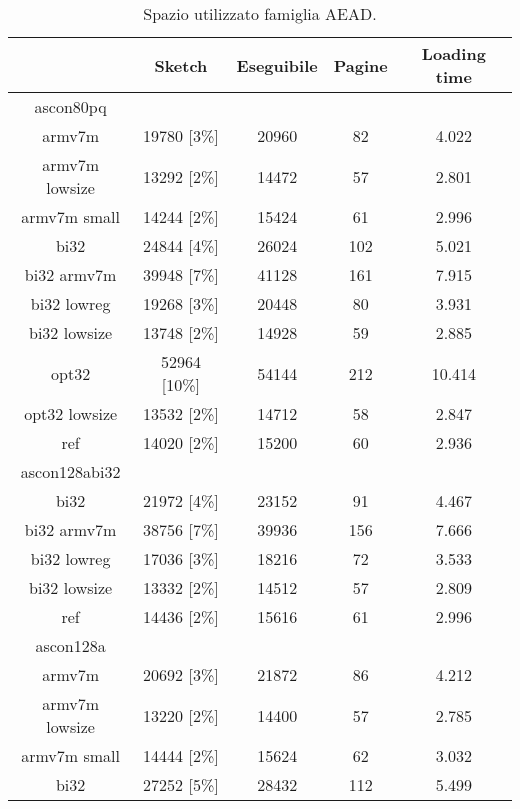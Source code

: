 \begin{table}[h]
    \caption{Spazio utilizzato famiglia AEAD.}
    \centering
	\begin{tabular}{|c|c|c|c|c|}
		\hline
         & Sketch & Eseguibile & Pagine & Loading time \\
        \hline
        ascon80pq & & & & \\
        \hline
        armv7m & 19780 [3\%] & 20960 & 82 & 4.022 \\
        \hline
        armv7m lowsize & 13292 [2\%] & 14472 & 57 & 2.801 \\
        \hline
        armv7m small & 14244 [2\%] & 15424 & 61 & 2.996 \\
        \hline
        bi32 & 24844 [4\%] & 26024 & 102 & 5.021 \\
        \hline
        bi32 armv7m & 39948 [7\%] & 41128 & 161 & 7.915 \\
        \hline
        bi32 lowreg & 19268 [3\%] & 20448 & 80 & 3.931 \\
        \hline
        bi32 lowsize & 13748 [2\%] & 14928 & 59 & 2.885 \\
        \hline
        opt32 & 52964 [10\%] & 54144 & 212 & 10.414 \\
        \hline
        opt32 lowsize & 13532 [2\%] & 14712 & 58 & 2.847 \\
        \hline
        ref & 14020 [2\%] & 15200 & 60 & 2.936 \\
        \hline
        ascon128abi32 & & & & \\
        \hline
        bi32 & 21972 [4\%] & 23152 & 91 & 4.467 \\
        \hline
        bi32 armv7m & 38756 [7\%] & 39936 & 156 & 7.666 \\
        \hline
        bi32 lowreg & 17036 [3\%] & 18216 & 72 & 3.533 \\
        \hline
        bi32 lowsize & 13332 [2\%] & 14512 & 57 & 2.809 \\
        \hline
        ref & 14436 [2\%] & 15616 & 61 & 2.996 \\
        \hline
        ascon128a & & & & \\
        \hline
        armv7m & 20692 [3\%] & 21872 & 86 & 4.212 \\
        \hline
        armv7m lowsize & 13220 [2\%] & 14400 & 57 & 2.785 \\
        \hline
        armv7m small & 14444 [2\%] & 15624 & 62 & 3.032 \\
        \hline
        bi32 & 27252 [5\%] & 28432 & 112 & 5.499 \\

\end{tabular}
\end{table}
